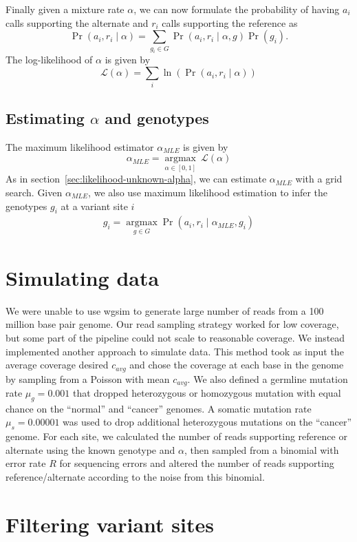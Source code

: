 \documentclass[12pt]{article}
\begin{document}
Finally given a mixture rate $\alpha$, we can now formulate the
probability of having $a_i$ calls supporting the alternate and $r_i$
calls supporting the reference as
\[
\Pr(a_i, r_i \mid \alpha) = \sum_{g_i \in G} \Pr(a_i, r_i \mid \alpha, g) \Pr(g_i).
\]
The log-likelihood of $\alpha$ is given by
\[
\mathcal{L}(\alpha) = \sum_i \ln \left( \Pr(a_i, r_i \mid \alpha) \right)
\]

\subsection{Estimating $\alpha$ and genotypes}
The maximum likelihood estimator $\alpha_{MLE}$ is given by
\[
\alpha_{MLE} = \underset{\alpha \in [0,1]}{\operatorname{argmax}}~\mathcal{L}(\alpha)
\]
As in section~\ref{sec:likelihood-unknown-alpha}, we can estimate
$\alpha_{MLE}$ with a grid search.  Given $\alpha_{MLE}$, we also use
maximum likelihood estimation to infer the genotypes $g_i$ at a
variant site $i$
\begin{align*}
g_i = \underset{g \in G}{\operatorname{argmax}} \Pr(a_i, r_i \mid \alpha_{MLE}, g_i)
\end{align*}

\section{Simulating data}

We were unable to use wgsim to generate large number of reads from a 100 million base pair genome. Our read sampling strategy worked for low coverage, but some part of the pipeline could not scale to reasonable coverage. We instead implemented another approach to simulate data. This method took as input the average coverage desired $c_{avg}$ and chose the coverage at each base in the genome by sampling from a Poisson with mean $c_{avg}$. We also defined a germline mutation rate $\mu_g = 0.001$ that dropped heterozygous or homozygous mutation with equal chance on the ``normal'' and ``cancer'' genomes. A somatic mutation rate $\mu_s = 0.00001$ was used to drop additional heterozygous mutations on the ``cancer'' genome. For each site, we calculated the number of reads supporting reference or alternate using the known genotype and $\alpha$, then sampled from a binomial with error rate $R$ for sequencing errors and altered the number of reads supporting reference/alternate according to the noise from this binomial.

\section{Filtering variant sites}
\end{document}
